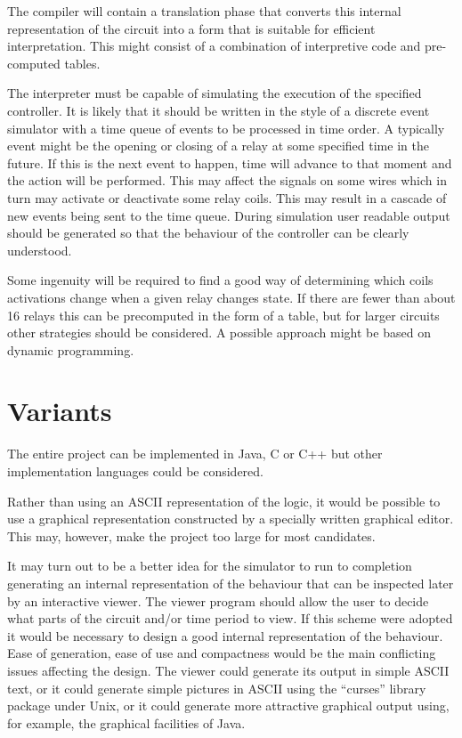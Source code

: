 \documentclass[12pt]{article}
\begin{document}
The compiler will contain a translation phase that converts this
internal representation of the circuit into a form that is suitable
for efficient interpretation.  This might consist of a combination of
interpretive code and pre-computed tables.

The interpreter must be capable of simulating the execution of the
specified controller.  It is likely that it should be written in the
style of a discrete event simulator with a time queue of events to be
processed in time order. A typically event might be the opening or
closing of a relay at some specified time in the future. If this is
the next event to happen, time will advance to that moment and the
action will be performed.  This may affect the signals on some wires
which in turn may activate or deactivate some relay coils. This may
result in a cascade of new events being sent to the time queue. During
simulation user readable output should be generated so that the
behaviour of the controller can be clearly understood.

Some ingenuity will be required to find a good way of determining
which coils activations change when a given relay changes state.  If
there are fewer than about 16 relays this can be precomputed in the
form of a table, but for larger circuits other strategies should be
considered. A possible approach might be based on dynamic programming.


\section*{Variants}
 
The entire project can be implemented in Java, C or C++ but other
implementation languages could be considered.

Rather than using an ASCII representation of the logic, it would be
possible to use a graphical representation constructed by a specially
written graphical editor. This may, however, make the project
too large for most candidates.

It may turn out to be a better idea for the simulator to run to
completion generating an internal representation of the behaviour that
can be inspected later by an interactive viewer. The viewer program
should allow the user to decide what parts of the circuit and/or time
period to view.  If this scheme were adopted it would be necessary to
design a good internal representation of the behaviour. Ease of
generation, ease of use and compactness would be the main conflicting
issues affecting the design.  The viewer could generate its output in
simple ASCII text, or it could generate simple pictures in ASCII using
the ``curses'' library package under Unix, or it could generate more
attractive graphical output using, for example, the graphical
facilities of Java.
\end{document}
